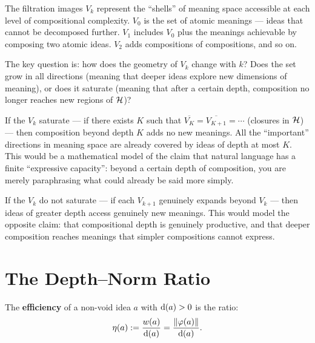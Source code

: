 \begin{interpretation}
\label{interp:filtration}
The filtration images $V_k$ represent the ``shells'' of meaning space accessible
at each level of compositional complexity. $V_0$ is the set of atomic meanings
--- ideas that cannot be decomposed further. $V_1$ includes $V_0$ plus the
meanings achievable by composing two atomic ideas. $V_2$ adds compositions of
compositions, and so on.

The key question is: how does the geometry of $V_k$ change with $k$? Does the
set grow in all directions (meaning that deeper ideas explore new dimensions of
meaning), or does it saturate (meaning that after a certain depth, composition
no longer reaches new regions of $\mathcal{H}$)?

If the $V_k$ saturate --- if there exists $K$ such that $\overline{V_K} =
\overline{V_{K+1}} = \cdots$ (closures in $\mathcal{H}$) --- then composition
beyond depth $K$ adds no new meanings. All the ``important'' directions in
meaning space are already covered by ideas of depth at most $K$. This would be
a mathematical model of the claim that natural language has a finite
``expressive capacity'': beyond a certain depth of composition, you are merely
paraphrasing what could already be said more simply.

If the $V_k$ do not saturate --- if each $V_{k+1}$ genuinely expands beyond
$V_k$ --- then ideas of greater depth access genuinely new meanings. This
would model the opposite claim: that compositional depth is genuinely
productive, and that deeper composition reaches meanings that simpler
compositions cannot express.
\end{interpretation}


\section{The Depth--Norm Ratio}

\begin{definition}
\label{def:efficiency}
The \textbf{efficiency} of a non-void idea $a$ with $\operatorname{d}(a) > 0$ is the
ratio:
\[
  \eta(a) := \frac{w(a)}{\operatorname{d}(a)} = \frac{\lVert \varphi(a) \rVert}{\operatorname{d}(a)}.
\]
\end{definition}

